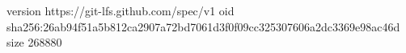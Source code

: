 version https://git-lfs.github.com/spec/v1
oid sha256:26ab94f51a5b812ca2907a72bd7061d3f0f09cc325307606a2dc3369e98ac46d
size 268880

